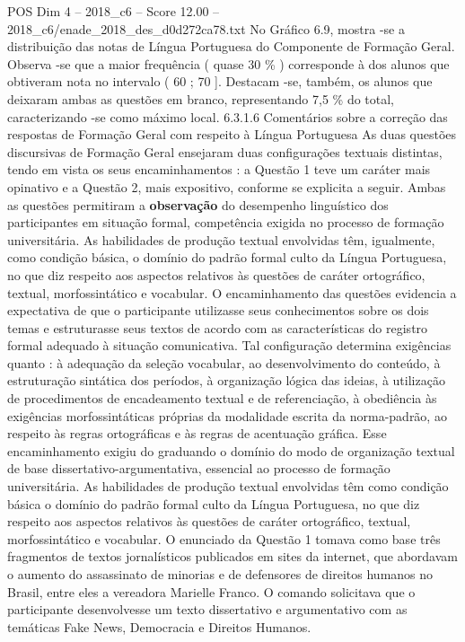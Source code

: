 \begin{textsample}{POS Dim 4 – 2018\_c6 – Score 12.00 – 2018\_c6/enade\_2018\_des\_d0d272ca78.txt}
No Gráfico 6.9, mostra -se a distribuição das notas de Língua Portuguesa do Componente de Formação Geral.
Observa -se que a maior frequência ( quase 30 \% ) corresponde à dos alunos que obtiveram nota no intervalo ( 60 ; 70 ].
Destacam -se, também, os alunos que deixaram ambas as questões em branco, representando 7,5 \% do total, caracterizando -se como máximo local. 6.3.1.6 Comentários sobre a correção das respostas de Formação Geral com respeito à Língua Portuguesa As duas questões discursivas de Formação Geral ensejaram duas configurações textuais distintas, tendo em vista os seus encaminhamentos : a Questão 1 teve um caráter mais opinativo e a Questão 2, mais expositivo, conforme se explicita a seguir.
Ambas as questões permitiram a \textbf{observação} do desempenho linguístico dos participantes em situação formal, competência exigida no processo de formação universitária.
As habilidades de produção textual envolvidas têm, igualmente, como condição básica, o domínio do padrão formal culto da Língua Portuguesa, no que diz respeito aos aspectos relativos às questões de caráter ortográfico, textual, morfossintático e vocabular.
O encaminhamento das questões evidencia a expectativa de que o participante utilizasse seus conhecimentos sobre os dois temas e estruturasse seus textos de acordo com as características do registro formal adequado à situação comunicativa.
Tal configuração determina exigências quanto : à adequação da seleção vocabular, ao desenvolvimento do conteúdo, à estruturação sintática dos períodos, à organização lógica das ideias, à utilização de procedimentos de encadeamento textual e de referenciação, à obediência às exigências morfossintáticas próprias da modalidade escrita da norma-padrão, ao respeito às regras ortográficas e às regras de acentuação gráfica.
Esse encaminhamento exigiu do graduando o domínio do modo de organização textual de base dissertativo-argumentativa, essencial ao processo de formação universitária.
As habilidades de produção textual envolvidas têm como condição básica o domínio do padrão formal culto da Língua Portuguesa, no que diz respeito aos aspectos relativos às questões de caráter ortográfico, textual, morfossintático e vocabular.
O enunciado da Questão 1 tomava como base três fragmentos de textos jornalísticos publicados em sites da internet, que abordavam o aumento do assassinato de minorias e de defensores de direitos humanos no Brasil, entre eles a vereadora Marielle Franco.
O comando solicitava que o participante desenvolvesse um texto dissertativo e argumentativo com as temáticas Fake News, Democracia e Direitos Humanos.

\end{textsample}
